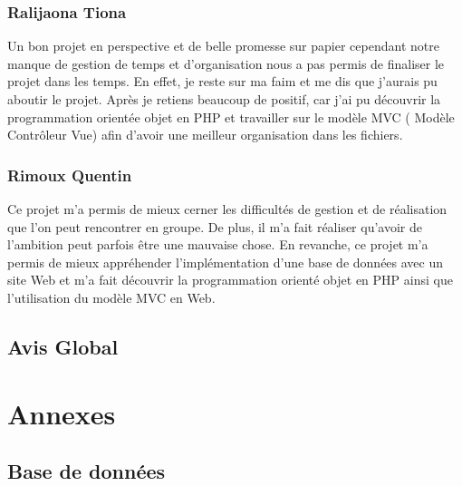 \documentclass[11pt,a4paper]{article}
\begin{document}
\subsubsection{Ralijaona Tiona}
Un bon projet en perspective et de belle promesse sur papier cependant notre manque de gestion de temps et d'organisation nous a pas permis de finaliser le projet dans les temps. En effet, je reste sur ma faim et me dis que j'aurais pu aboutir le projet. Après je retiens beaucoup de positif, car j'ai pu découvrir la programmation orientée objet en PHP et travailler sur le modèle MVC ( Modèle Contrôleur Vue) afin d'avoir une meilleur organisation dans les fichiers. 
\subsubsection{Rimoux Quentin}
Ce projet m'a permis de mieux cerner les difficultés de gestion et de réalisation que l'on peut rencontrer en groupe. De plus, il m'a fait réaliser qu'avoir de l'ambition peut parfois être une mauvaise chose. En revanche, ce projet m'a permis de mieux appréhender l'implémentation d'une base de données avec un site Web et m'a fait découvrir la programmation orienté objet en PHP ainsi que l'utilisation du modèle MVC en Web.
\subsection{Avis Global}

\newpage{}
\section{Annexes}
\subsection{Base de données}
\end{document}
